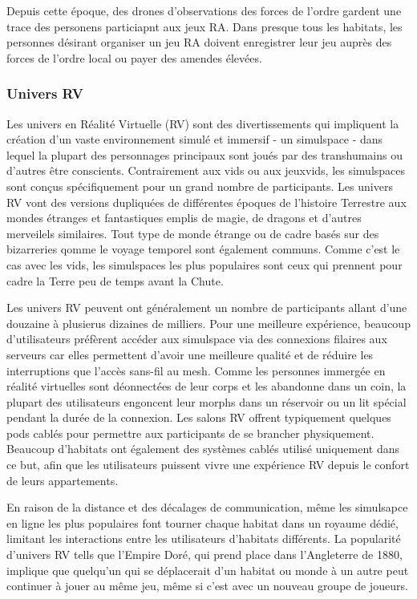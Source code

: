                Depuis cette époque, des drones d'observations des forces de l'ordre gardent une trace des personens particiapnt aux jeux RA. Dans presque tous les habitats, les personnes désirant organiser un jeu RA doivent enregistrer leur jeu auprès des forces de l'ordre local ou payer des amendes élevées. 

               \subsubsection{Univers RV} \label{sec:vr-worlds} 

               Les univers en Réalité Virtuelle (RV) sont des divertissements qui impliquent la création d'un vaste environnement simulé et immersif - un simulspace - dans lequel la plupart des personnages principaux sont joués par des transhumains ou d'autres être conscients. Contrairement aux vids ou aux jeuxvids, les simulspaces sont conçus spécifiquement pour un grand nombre de participants. Les univers RV vont des versions dupliquées de différentes époques de l'histoire Terrestre aux mondes étranges et fantastiques emplis de magie, de dragons et d'autres merveilels similaires. Tout type de monde étrange ou de cadre basés sur des bizarreries qomme le voyage temporel sont également communs. Comme c'est le cas avec les vids, les simulspaces les plus populaires sont ceux qui prennent pour cadre la Terre peu de temps avant la Chute. 

               Les univers RV peuvent ont généralement un nombre de participants allant d'une douzaine à plusierus dizaines de milliers. Pour une meilleure expérience, beaucoup d'utilisateurs préfèrent accéder aux simulspace via des connexions filaires aux serveurs car elles permettent d'avoir une meilleure qualité et de réduire les interruptions que l'accès sans-fil au mesh. Comme les personnes immergée en réalité virtuelles sont déonnectées de leur corps et les abandonne dans un coin, la plupart des utilisateurs engoncent leur morphs dans un réservoir ou un lit spécial pendant la durée de la connexion. Les salons RV offrent typiquement quelques pods cablés pour permettre aux participants de se brancher physiquement. Beaucoup d'habitats ont également des systèmes cablés utilisé uniquement dans ce but, afin que les utilisateurs puissent vivre une expérience RV depuis le confort de leurs appartements. 

               En raison de la distance et des décalages de communication, même les simulsapce en ligne les plus populaires font tourner chaque habitat dans un royaume dédié, limitant les interactions entre les utilisateurs d'habitats différents. La popularité d'univers RV tells que l'Empire Doré, qui prend place dans l'Angleterre de 1880, implique que quelqu'un qui se déplacerait d'un habitat ou monde à un autre peut continuer à jouer au même jeu, même si c'est avec un nouveau groupe de joueurs. 

